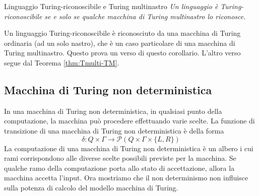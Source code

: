 \begin{Corollario}{Linguaggio Turing-riconoscibile e Turing multinastro}{}
\textit{Un linguaggio è Turing-riconoscibile se e solo se qualche macchina di Turing multinastro lo riconosce.}

\begin{demonstration}
Un linguaggio Turing-riconoscibile è riconosciuto da una macchina di Turing ordinaria (ad un solo nastro), che è un caso particolare di una macchina di Turing multinastro. Questo prova un verso di questo corollario. L'altro verso segue dal Teorema \ref{thm:Tmulti-TM}.
\end{demonstration}
\end{Corollario}

\subsection{Macchina di Turing non deterministica}
In una macchina di Turing non deterministica, in qualsiasi punto della computazione, la macchina può procedere effettuando varie scelte. La funzione di transizione di una macchina di Turing non deterministica è della forma
\begin{equation*}
    \delta: Q\times\Gamma\rightarrow\mathcal{P}(Q\times\Gamma\times\{L,R\})
\end{equation*}
La computazione di una macchina di Turing non deterministica è un albero i cui rami corrispondono alle diverse scelte possibili previste per la macchina. Se qualche ramo della computazione porta allo stato di accettazione, allora la macchina accetta l'input. Ora mostriamo che il non determinismo non influisce sulla potenza di calcolo del modello macchina di Turing.

